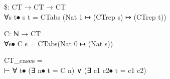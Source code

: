 \begin{HOLConst}
\+\PrNM{} \PrNL{}\$\PrNN{}: CT → CT → CT\\
\PrPH{}\PrPM{}\PrPM{}\PrPM{}\PrPM{}\PrPM{}\PrPM{}\PrPM{}\PrPM{}\PrPM{}\PrPM{}\PrPM{}
\+\PrNM{} ∀s t⦁ s  t = CTabs (Nat 1 ↦ (CTrep s) ↦ (CTrep t))\\
\end{HOLConst}

\begin{HOLConst}
\+\PrNM{} \PrNL{}C\PrNN{}: ℕ → CT\\
\PrPH{}\PrPM{}\PrPM{}\PrPM{}\PrPM{}\PrPM{}\PrPM{}\PrPM{}\PrPM{}\PrPM{}\PrPM{}\PrPM{}
\+\PrNM{} ∀s⦁ C s = CTabs(Nat 0 ↦ (Nat s))\\
\end{HOLConst}

\begin{GFT}{}
\+\PrNL{}CT\_cases\PrNN{} =\\
\+	⊢ ∀ t⦁ (∃ n⦁ t = C n) ∨ (∃ c1 c2⦁ t = c1  c2)\\
\end{GFT}

